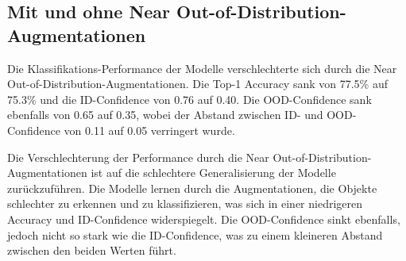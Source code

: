 \subsection{Mit und ohne Near Out-of-Distribution-Augmentationen} \label{sec:results-comparison-ood}

Die Klassifikations-Performance der Modelle verschlechterte sich durch die Near Out-of-Distribution-Augmentationen. Die Top-1 Accuracy sank von 77.5\% auf 75.3\% und die ID-Confidence von 0.76 auf 0.40. Die OOD-Confidence sank ebenfalls von 0.65 auf 0.35, wobei der Abstand zwischen ID- und OOD-Confidence von 0.11 auf 0.05 verringert wurde.

Die Verschlechterung der Performance durch die Near Out-of-Distribution-Augmentationen ist auf die schlechtere Generalisierung der Modelle zurückzuführen. Die Modelle lernen durch die Augmentationen, die Objekte schlechter zu erkennen und zu klassifizieren, was sich in einer niedrigeren Accuracy und ID-Confidence widerspiegelt. Die OOD-Confidence sinkt ebenfalls, jedoch nicht so stark wie die ID-Confidence, was zu einem kleineren Abstand zwischen den beiden Werten führt.
